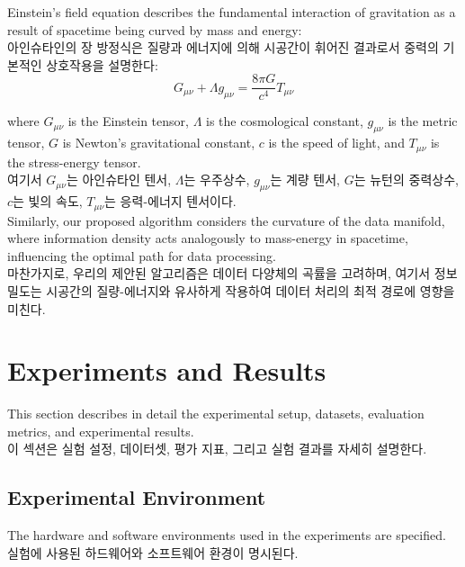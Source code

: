 \documentclass[preprint,12pt]{elsarticle}
\begin{document}
Einstein's field equation describes the fundamental interaction of gravitation as a result of spacetime being curved by mass and energy: \\
아인슈타인의 장 방정식은 질량과 에너지에 의해 시공간이 휘어진 결과로서 중력의 기본적인 상호작용을 설명한다: \\

\begin{equation}
G_{\mu\nu} + \Lambda g_{\mu\nu} = \frac{8\pi G}{c^4} T_{\mu\nu}
\end{equation}

where $G_{\mu\nu}$ is the Einstein tensor, $\Lambda$ is the cosmological constant, $g_{\mu\nu}$ is the metric tensor, $G$ is Newton's gravitational constant, $c$ is the speed of light, and $T_{\mu\nu}$ is the stress-energy tensor. \\
여기서 $G_{\mu\nu}$는 아인슈타인 텐서, $\Lambda$는 우주상수, $g_{\mu\nu}$는 계량 텐서, $G$는 뉴턴의 중력상수, $c$는 빛의 속도, $T_{\mu\nu}$는 응력-에너지 텐서이다. \\

Similarly, our proposed algorithm considers the curvature of the data manifold, where information density acts analogously to mass-energy in spacetime, influencing the optimal path for data processing. \\
마찬가지로, 우리의 제안된 알고리즘은 데이터 다양체의 곡률을 고려하며, 여기서 정보 밀도는 시공간의 질량-에너지와 유사하게 작용하여 데이터 처리의 최적 경로에 영향을 미친다. \\

\section{Experiments and Results}
\label{sec:experiments}

This section describes in detail the experimental setup, datasets, evaluation metrics, and experimental results. \\
이 섹션은 실험 설정, 데이터셋, 평가 지표, 그리고 실험 결과를 자세히 설명한다. \\

\subsection{Experimental Environment}
The hardware and software environments used in the experiments are specified. \\
실험에 사용된 하드웨어와 소프트웨어 환경이 명시된다. \\
\end{document}
